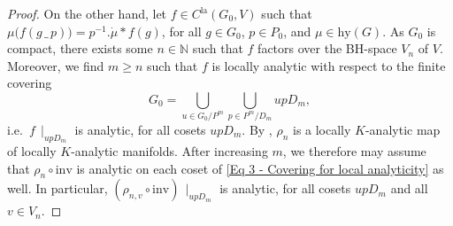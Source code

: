 \documentclass[a4paper, reqno, 10pt]{amsart}
\theoremstyle{definition}
\numberwithin{equation}{section}
\newcommand{\blank}{{\,\_\,}}
\newcommand{\hy}{{\mathrm{hy}}}
\newcommand{\inv}{{\mathrm{inv}}}
\newcommand{\la}{{\mathrm{la}}}
\newcommand{\res}[1]{{\!\,\mid_{#1}}}
\newcommand{\BN}{{\mathbb {N}}}
\begin{document}
\begin{proof}
	
	On the other hand, let $f \in C^\la(G_0,V)$ such that $\mu \big( f(g \blank p) \big) = p^{-1} . \dot{\mu} \ast f(g)$, for all $g \in G_0$, $p\in P_0$, and $\mu \in \hy(G)$.
	As $G_0$ is compact, there exists some $n \in \BN$ such that $f$ factors over the BH-space $V_n$ of $V$.
	Moreover, we find $m\geq n$ such that $f$ is locally analytic with respect to the finite covering 
	\begin{equation}\label{Eq 3 - Covering for local analyticity}
		G_0 = \bigcup_{u\in G_0/P^m } \bigcup_{p\in P^m/D_m} u p D_m ,
	\end{equation}
	i.e.\ $f\res{u p D_m}$ is analytic, for all cosets $u p D_m$.
	By , $\rho_n$ is a locally $K$-analytic map of locally $K$-analytic manifolds.
	After increasing $m$, we therefore may assume that $\rho_n \circ \inv$ is analytic on each coset of \eqref{Eq 3 - Covering for local analyticity} as well.
	In particular, $(\rho_{n,v} \circ \inv)\res{up D_m}$ is analytic, for all cosets $up D_m$ and all $v \in V_n$.
	

\end{proof}
\end{document}
